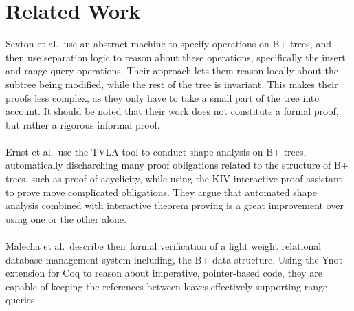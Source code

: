 \section{Related Work}
\label{sec:RelatedWork}
Sexton et al.\,\cite{sexton2008reasoning} use an abstract machine to specify operations on B+ trees, and then use separation logic to reason about these operations, specifically the insert and range query operations. Their approach lets them reason locally about the subtree being modified, while the rest of the tree is invariant. This makes their proofs less complex, as they only have to take a small part of the tree into account. It should be noted that their work does not constitute a formal proof, but rather a rigorous informal proof.

\paragraph{}
Ernst et al.\,\cite{ernst2011verification} use the TVLA tool to conduct shape analysis on B+ trees, automatically discharching many proof obligations related to the structure of B+ trees, such as proof of acyclicity, while using the KIV interactive proof assistant to prove move complicated obligations. They argue that automated shape analysis combined with interactive theorem proving is a great improvement over using one or the other alone.

\paragraph{}
Malecha et al.\,\cite{malecha2010toward} describe their formal verification of a light weight relational database management system including, the B+ data structure. Using the Ynot extension for Coq to reason about imperative, pointer-based code, they are capable of keeping the references between leaves,effectively supporting range queries.
